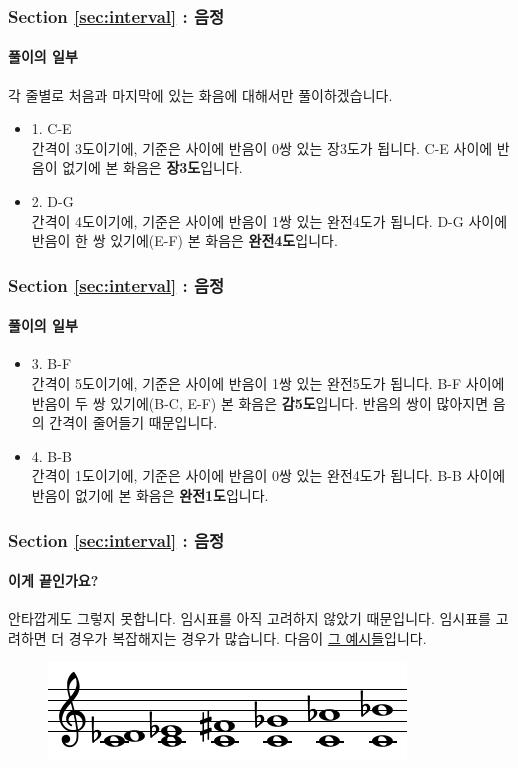 \documentclass{beamer}
\begin{document}
	\begin{frame}
		\frametitle{Section \ref{sec:interval} : 음정}
		\framesubtitle{풀이의 일부}
		각 줄별로 처음과 마지막에 있는 화음에 대해서만 풀이하겠습니다.
		\begin{itemize}
			\item 1. C-E\\
			간격이 3도이기에, 기준은 사이에 반음이 0쌍 있는 장3도가 됩니다. C-E 사이에 반음이 없기에 본 화음은 {\bf 장3도}입니다.
			\item 2. D-G\\
			간격이 4도이기에, 기준은 사이에 반음이 1쌍 있는 완전4도가 됩니다. D-G 사이에 반음이 한 쌍 있기에(E-F) 본 화음은 {\bf 완전4도}입니다.
		\end{itemize}
	\end{frame}
	
	\begin{frame}
		\frametitle{Section \ref{sec:interval} : 음정}
		\framesubtitle{풀이의 일부}
		\begin{itemize}
			\item 3. B-F\\
			간격이 5도이기에, 기준은 사이에 반음이 1쌍 있는 완전5도가 됩니다. B-F 사이에 반음이 두 쌍 있기에(B-C, E-F) 본 화음은 {\bf 감5도}입니다. 반음의 쌍이 많아지면 음의 간격이 줄어들기 때문입니다.
			\item 4. B-B\\
			간격이 1도이기에, 기준은 사이에 반음이 0쌍 있는 완전4도가 됩니다. B-B  사이에 반음이 없기에 본 화음은 {\bf 완전1도}입니다.
		\end{itemize}
	\end{frame}
	
	\begin{frame}
		\frametitle{Section \ref{sec:interval} : 음정}
		\framesubtitle{이게 끝인가요?}
		안타깝게도 그렇지 못합니다. 임시표를 아직 고려하지 않았기 때문입니다. 임시표를 고려하면 더 경우가 복잡해지는 경우가 많습니다. 다음이 {\color{cyan}\href{run:res/mp3/6/interval/etc.mp3}{그 예시들}}입니다.
		\begin{figure}
			\centering
			\includegraphics[width=\textwidth]{res/pdf/6/interval/etc.pdf}
		\end{figure}
	\end{frame}
	
\end{document}
